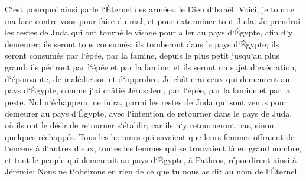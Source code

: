 \verse C`est pourquoi ainsi parle l`Éternel des armées, le Dieu d`Israël: Voici, je tourne ma face contre vous pour faire du mal, et pour exterminer tout Juda. 
\verse Je prendrai les restes de Juda qui ont tourné le visage pour aller au pays d`Égypte, afin d`y demeurer; ils seront tous consumés, ils tomberont dans le pays d`Égypte; ils seront consumés par l`épée, par la famine, depuis le plus petit jusqu`au plus grand; ils périront par l`épée et par la famine; et ils seront un sujet d`exécration, d`épouvante, de malédiction et d`opprobre. 
\verse Je châtierai ceux qui demeurent au pays d`Égypte, comme j`ai châtié Jérusalem, par l`épée, par la famine et par la peste. 
\verse Nul n`échappera, ne fuira, parmi les restes de Juda qui sont venus pour demeurer au pays d`Égypte, avec l`intention de retourner dans le pays de Juda, où ils ont le désir de retourner s`établir; car ils n`y retourneront pas, sinon quelques réchappés. 
\verse Tous les hommes qui savaient que leurs femmes offraient de l`encens à d`autres dieux, toutes les femmes qui se trouvaient là en grand nombre, et tout le peuple qui demeurait au pays d`Égypte, à Pathros, répondirent ainsi à Jérémie: 
\verse Nous ne t`obéirons en rien de ce que tu nous as dit au nom de l`Éternel. 

